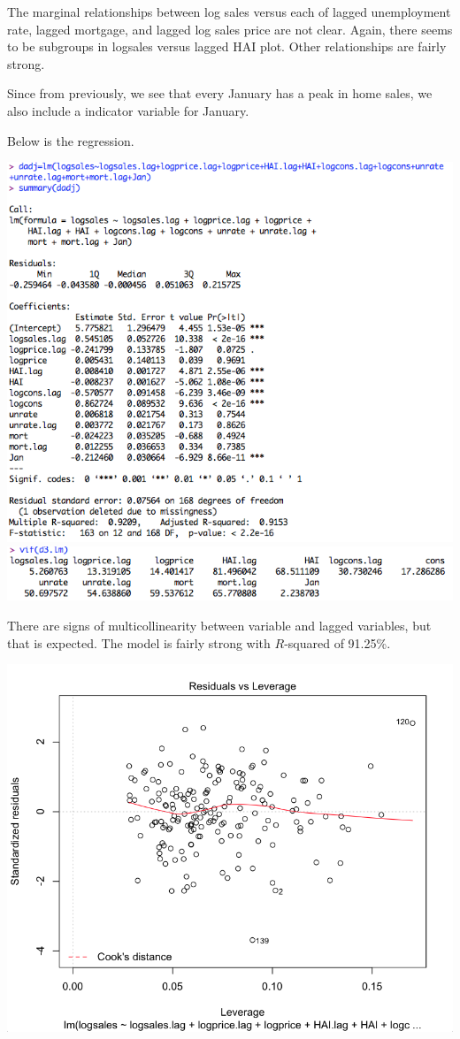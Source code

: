 \documentclass[a4 paper, 11 pt]{article}
\begin{document}
The marginal relationships between log sales versus each of lagged unemployment rate, lagged mortgage, and lagged log sales price are not clear. Again, there seems to be subgroups in logsales versus lagged HAI plot. Other relationships are fairly strong.

Since from previously, we see that every January has a peak in home sales, we also include a indicator variable for January.

Below is the regression.
\begin{center}
\includegraphics[scale=0.4]{d3lm}\\
\includegraphics[scale=0.4]{d3vif}
\end{center}
There are signs of multicollinearity between variable and lagged variables, but that is expected. The model is fairly strong with $R$-squared of 91.25\%. \begin{center}
\includegraphics[scale=0.4]{d3diag}
\end{center}
\end{document}
